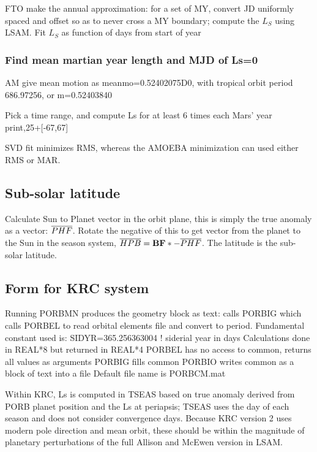 \documentclass[draft]{article}
\begin{document}
FTO make the annual approximation: for a set of MY, convert JD uniformly spaced
and offset so as to never cross a MY boundary; compute the $L_S$ using LSAM.
Fit $L_S$ as function of days from start of year

\subsubsection{Find mean martian year length and MJD of Ls=0}

AM give mean motion as meanmo=0.52402075D0, with tropical orbit period  686.97256, or m=0.52403840 

Pick a time range, and compute Ls for at least 6 times each Mars' year 
\\ print,25+[-67,67]

SVD fit minimizes RMS, whereas the AMOEBA minimization can used either RMS or MAR.   

\subsection{Sub-solar latitude} 
Calculate Sun to Planet vector in the orbit plane, this is simply the true
anomaly as a vector: $\overline{PHF} $. Rotate the negative of this to get vector from
the planet to the Sun in the season system, $ \overline{HPB}= \mathbf{BF} \ast
-\overline{PHF} $. The latitude is the sub-solar latitude.

\subsection{Form for KRC system}
Running PORBMN produces the geometry block as text:
\qi calls PORBIG which
\qii calls PORBEL to read orbital elements file and convert   to period.
\qiii Fundamental constant used is: SIDYR=365.256363004  ! siderial year in days
\qii Calculations done in REAL*8 but returned in REAL*4
\qii PORBEL has no access to common, returns all values as arguments
\qi  PORBIG fills common 
\qi  PORBIO writes common as a block of text into a file
\qii Default file name is PORBCM.mat

\vspace{2.mm}

Within KRC, Ls is computed in TSEAS based on true anomaly derived from PORB
planet position and the Ls at periapsis; TSEAS uses the day of each season and
does not consider convergence days. Because KRC version 2 uses modern pole
direction and mean orbit, these should be within the magnitude of planetary
perturbations of the full Allison and McEwen version in LSAM.
\end{document}

